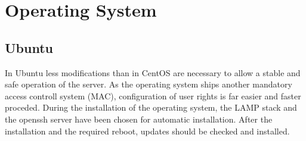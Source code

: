 
\chapter{Operating System}
\section{Ubuntu}
In Ubuntu less modifications than in CentOS are necessary to allow a stable and safe operation of the server. As the operating system ships another mandatory access controll system
(MAC), configuration of user rights is far easier and faster proceded. During the installation of the operating system, the LAMP stack and the openssh server have been chosen for
automatic installation. After the installation and the required reboot, updates should be checked and installed.\\

